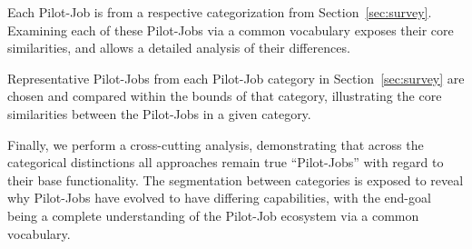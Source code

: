 \documentclass{sig-alternate}
\begin{document}

Each Pilot-Job is from a respective categorization from
Section~\ref{sec:survey}.  Examining each of these Pilot-Jobs via a
common vocabulary exposes their core similarities, and allows a
detailed analysis of their differences.

Representative Pilot-Jobs from each Pilot-Job category
in Section~\ref{sec:survey} are chosen and compared within
the bounds of that category, illustrating the core similarities
between the Pilot-Jobs in a given category.


Finally, we perform
a cross-cutting analysis, demonstrating that across the categorical
distinctions all approaches remain true ``Pilot-Jobs'' with regard
to their base functionality.  The segmentation between categories
is exposed to reveal why Pilot-Jobs have evolved to have
differing capabilities, with the end-goal being a
complete understanding of the Pilot-Job ecosystem via a common
vocabulary.

\end{document}
